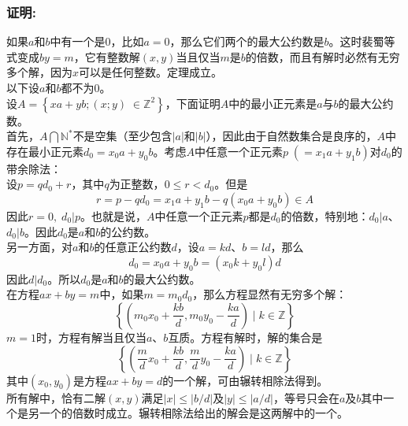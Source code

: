 \documentclass[UTF8]{ctexart}
\begin{document}
\subsubsection*{证明:}
如果$a$和$b$中有一个是$0$，比如$a = 0$，那么它们两个的最大公约数是$b$。这时裴蜀等式变成$by = m$，它有整数解$(x,y)$当且仅当$m$是$b$的倍数，而且有解时必然有无穷多个解，因为$x$可以是任何整数。定理成立。\\
以下设$a$和$b$都不为$0$。\\
设$A = \left\{xa + yb;(x;y)\;\in \mathbb{Z}^2\right\}$，下面证明$A$中的最小正元素是$a$与$b$的最大公约数。\\
首先，$A \bigcap \mathbb{N}^*$不是空集（至少包含$|a|$和$|b|$），因此由于自然数集合是良序的，$A$中存在最小正元素$d_0 = x_0a + y_0b$。考虑$A$中任意一个正元素$p\;(= x_1a + y_1b)$对$d_0$的带余除法：\\
设$p = qd_0 + r$，其中$q$为正整数，$0 \leq r < d_0$。但是
\[ r = p - qd_0 = x_1a + y_1b - q(x_0a + y_0b) \in A \]
因此$r = 0,\;d_0 | p$。也就是说，$A$中任意一个正元素$p$都是$d_0$的倍数，特别地：$d_0|a$、$d_0|b$。因此$d_0$是$a$和$b$的公约数。\\
另一方面，对$a$和$b$的任意正公约数$d$，设$a = kd$、$b = ld$，那么
\[ d_0 = x_0a + y_0b = (x_0k + y_0l)d \]
因此$d|d_0$。所以$d_0$是$a$和$b$的最大公约数。\\
在方程$ax + by = m$中，如果$m = m_0d_0$，那么方程显然有无穷多个解：
\[ \left\{(m_0x_0 + \frac {kb} d,m_0y_0 - \frac {ka} d)\;|\;k \in \mathbb{Z}\right\} \]
$m = 1$时，方程有解当且仅当$a$、$b$互质。方程有解时，解的集合是
\[ \left\{(\frac m dx_0 + \frac {kb} d,\frac m dy_0 - \frac {ka} d)\;|\;k \in \mathbb{Z}\right\} \]
其中$(x_0,y_0)$是方程$ax + by = d$的一个解，可由辗转相除法得到。\\
所有解中，恰有二解$(x,y)$满足$|x| \leq |b/d|$及$|y| \leq |a/d|$，等号只会在$a$及$b$其中一个是另一个的倍数时成立。辗转相除法给出的解会是这两解中的一个。
\printbibliography
\end{document}
